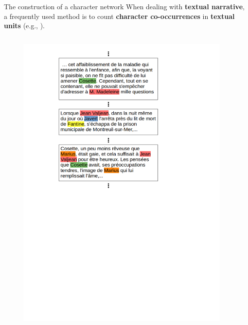 \documentclass[10pt]{beamer}
\newcommand{\imp}[1]{\textbf{\color{cyan}#1}}
\begin{document}
	\begin{frame}{The construction of a character network}
		When dealing with \imp{textual narrative}, a frequently used method is to count \imp{character co-occurrences} in \imp{textual units} (e.g., \cite{elsner_character-based_2012, rochat_analyse_2014}). \\
		\vspace{-0.4cm}
		\begin{columns}
			\begin{column}{0.5\textwidth}
				\begin{figure}
					\centering
					\includegraphics[width=1.4\textwidth]{img/textual_units.png}
				\end{figure}
			\end{column}
			\begin{column}{0.5\textwidth}
				\vspace{-4cm}
				\begin{table}

\end{table}
\end{column}
\end{columns}
\end{frame}
\end{document}
